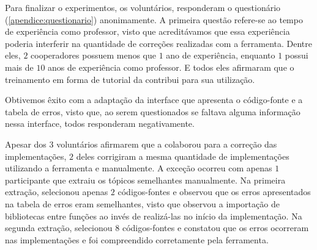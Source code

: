 %		
%		
		
		Para finalizar o experimentos, os voluntários, responderam o questionário (\cref{apendice:questionario})
		anonimamente. A primeira questão refere-se ao tempo de experiência como professor,
		visto que acreditávamos que essa experiência poderia interferir na quantidade
		de correções realizadas com a ferramenta. Dentre eles, $2$ cooperadores possuem
		menos que $1$ ano de experiência, enquanto $1$ possui mais de $10$ anos de
		experiência como professor. E todos eles afirmaram que o treinamento em forma
		de tutorial da  contribui para sua utilização.
		
		Obtivemos êxito com a adaptação da interface que apresenta o código-fonte e a
		tabela de erros, visto que, ao serem questionados se faltava
		alguma informação nessa interface, todos responderam negativamente.
		
		Apesar dos $3$ voluntários afirmarem que a  colaborou
		para a correção das implementações, $2$ deles corrigiram a mesma quantidade
		de implementações utilizando a ferramenta e manualmente. A exceção ocorreu com 
		apenas $1$ participante que extraiu os tópicos semelhantes manualmente. Na
		primeira extração, selecionou apenas $2$ códigos-fontes e observou que os
		erros apresentados na tabela de erros eram semelhantes, visto que observou
		a importação de bibliotecas entre funções ao invés de realizá-las no início
		da implementação. Na segunda extração, selecionou $8$ códigos-fontes e constatou
		que os erros ocorreram nas implementações e foi compreendido corretamente
		pela ferramenta.
		
